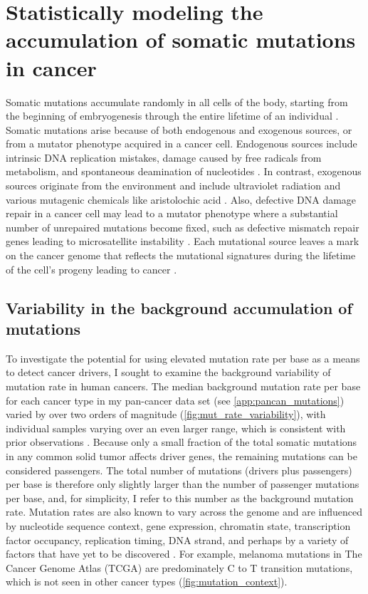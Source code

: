 
\chapter{Statistically modeling the accumulation of somatic mutations in cancer}
\label{chap:ch2}

Somatic mutations accumulate randomly in all cells of the body, starting from the beginning of embryogenesis through the entire lifetime of an individual \cite{RN63}. Somatic mutations arise because of both endogenous and exogenous sources, or from a mutator phenotype acquired in a cancer cell. Endogenous sources include intrinsic DNA replication mistakes, damage caused by free radicals from metabolism, and spontaneous deamination of nucleotides \cite{RN64}. In contrast, exogenous sources originate from the environment and include ultraviolet radiation \cite{RN64} and various mutagenic chemicals like aristolochic acid \cite{RN65}.  Also, defective DNA damage repair in a cancer cell may lead to a mutator phenotype where a substantial number of unrepaired mutations become fixed, such as defective mismatch repair genes leading to microsatellite instability \cite{RN68}. Each mutational source leaves a mark on the cancer genome that reflects the mutational signatures during the lifetime of the cell's progeny leading to cancer \cite{RN64}.

\section{Variability in the background accumulation of mutations}

To investigate the potential for using elevated mutation rate per base as a means to detect cancer drivers, I sought to examine the background variability of mutation rate in human cancers. The median background mutation rate per base for each cancer type in my pan-cancer data set (see \autoref{app:pancan_mutations}) \cite{RN70} varied by over two orders of magnitude (\autoref{fig:mut_rate_variability}), with individual samples varying over an even larger range, which is consistent with prior observations \cite{RN13, RN51}. Because only a small fraction of the total somatic mutations in any common solid tumor affects driver genes, the remaining mutations can be considered passengers. The total number of mutations (drivers plus passengers) per base is therefore only slightly larger than the number of passenger mutations per base, and, for simplicity, I refer to this number as the background mutation rate. Mutation rates are also known to vary across the genome \cite{RN13} and are influenced by nucleotide sequence context, gene expression, chromatin state, transcription factor occupancy, replication timing, DNA strand, and perhaps by a variety of factors that have yet to be discovered \cite{RN72, RN73, RN51, RN74}. For example, melanoma mutations in The Cancer Genome Atlas (TCGA) are predominately C to T transition mutations, which is not seen in other cancer types (\autoref{fig:mutation_context}).

